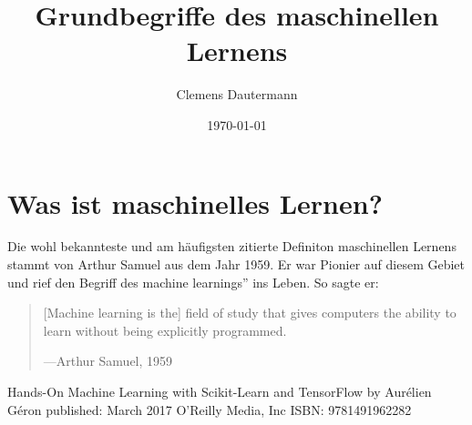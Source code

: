 \documentclass{article}
\author{Clemens Dautermann}
\title{Grundbegriffe des maschinellen Lernens}
\date{\today{}}
\begin{document}
\maketitle{}
\newpage
\tableofcontents{}
\newpage

\section{Was ist maschinelles Lernen?}
Die wohl bekannteste und am häufigsten zitierte Definiton maschinellen Lernens stammt von Arthur Samuel aus dem Jahr 1959. Er war Pionier auf diesem Gebiet und rief den Begriff des \glqq machine learnings'' ins Leben. So sagte er:
\begin{quote}
	[Machine learning is the] field of study that gives computers the ability to learn without being explicitly programmed\cite{1}.
	\begin{flushright}
		---Arthur Samuel, 1959
	\end{flushright}
\end{quote}
\newpage
\begin{thebibliography}{99}
	Hands-On Machine Learning with Scikit-Learn and TensorFlow\newline
	by Aurélien Géron\newline
	published: March 2017 O'Reilly Media, Inc\newline
	ISBN: 9781491962282
\end{thebibliography}
\end{document}
